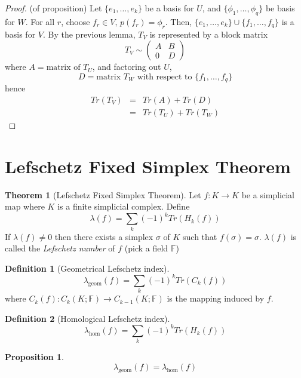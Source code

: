 \documentclass[a4paper,14pt]{extarticle}
\theoremstyle{definition}
\newtheorem*{theorem}{Theorem}
\newtheorem*{definition}{Definition}
\newtheorem*{proposition}{Proposition}
\begin{document}
\begin{proof}(of proposition)
	Let $\{e_1,\ldots,e_k\}$ be a basis for $U$, and $\{\phi_1,\ldots,\phi_q\}$ be basis for 
	$W$. For all $r$, choose $f_r\in V, \,p(f_r)=\phi_r$. Then,
	$\{e_1,\ldots,e_k\}\cup\{f_1,\ldots,f_q\}$ is a basis for $V$. By the previous lemma, 
	$T_V$ is represented by a block matrix 
	\[T_V\sim\begin{pmatrix}
		A&B\\0&D
	\end{pmatrix}\] where $A=\text{matrix of $T_U$}$, and factoring out $U$,
	\[D=\text{matrix $T_W$ with respect to $\{f_1,\ldots,f_q\}$}\] hence 
	\begin{eqnarray*}
		Tr(T_V) &=& Tr(A) + Tr(D)\\
		&=& Tr(T_U) + Tr(T_W)
	\end{eqnarray*}
\end{proof}

\section{Lefschetz Fixed Simplex Theorem}
\begin{theorem}[Lefschetz Fixed Simplex Theorem]
	Let $f:K\rightarrow K$ be a simplicial map where $K$ is a finite simplicial complex. 
Define \[\lambda(f)=\sum_k (-1)^k Tr(H_k(f))\] If $\lambda(f)\neq0$ then there exists a 
simplex $\sigma$ of $K$ such that $f(\sigma)=\sigma$. $\lambda(f)$ is called the 
\emph{Lefschetz number} of $f$ (pick a field $\mathbb{F}$)
\end{theorem}


\begin{definition}[Geometrical Lefschetz index]
	\[\lambda_\text{geom}(f)=\sum_k (-1)^k Tr(C_k(f))\] where
	$C_k(f):C_k(K;\mathbb{F})\rightarrow C_{k-1}(K;\mathbb{F})$ is the mapping induced by $f$.
\end{definition}

\begin{definition}[Homological Lefschetz index]
	\[\lambda_\text{hom}(f)=\sum_k (-1)^k Tr(H_k(f))\]
\end{definition}

\begin{proposition}
	\[\lambda_\text{geom}(f)=\lambda_\text{hom}(f)\]
\end{proposition}
\end{document}
